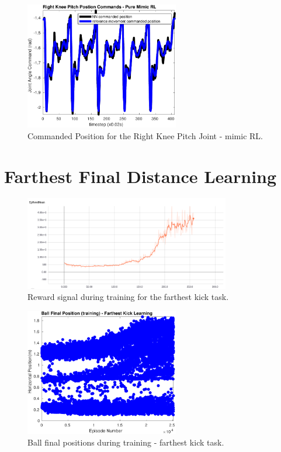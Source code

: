 \begin{figure}[H]
    \centering
    \includegraphics[width=0.6\textwidth]{Chapter7/plots/plot_joints_pos_mimic.pdf} 
    \caption{Commanded Position for the Right Knee Pitch Joint - mimic RL.}
    \label{fig:RL_cmd_pos}
\end{figure}

\section{Farthest Final Distance Learning}

\begin{figure}[H]
    \centering
    \includegraphics[width=0.8\textwidth]{Chapter7/figures/rew_mean_far_kick.png} 
    \caption{Reward signal during training for the farthest kick task.}
    \label{fig:RL_far_kick}
\end{figure}

\begin{figure}[H]
    \centering
    \includegraphics[width=0.6\textwidth]{Chapter7/plots/plot_ball_pos_far_kick_train.pdf} 
    \caption{Ball final positions during training - farthest kick task.}
    \label{fig:RL_far_kick_pos_train}
\end{figure}

